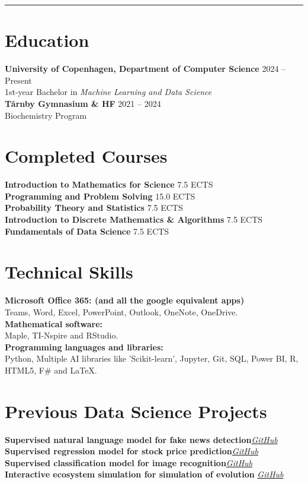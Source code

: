 \documentclass[a4paper,11.5pt]{article}
\begin{document}
\noindent\rule{\textwidth}{0.6pt}

\section*{Education}
\textbf{University of Copenhagen, Department of Computer Science} \hfill 2024 -- Present \\
1st-year Bachelor in \textit{Machine Learning and Data Science}\\
\textbf{T\aa rnby Gymnasium \& HF} \hfill 2021 -- 2024\\ 
Biochemistry Program

\section*{Completed Courses}
\textbf{Introduction to Mathematics for Science} \hfill 7.5 ECTS\\
\textbf{Programming and Problem Solving} \hfill 15.0 ECTS\\
\textbf{Probability Theory and Statistics} \hfill 7.5 ECTS\\
\textbf{Introduction to Discrete Mathematics \& Algorithms} \hfill 7.5 ECTS\\ 
\textbf{Fundamentals of Data Science} \hfill 7.5 ECTS

\section*{Technical Skills}
\textbf{Microsoft Office 365: (and all the google equivalent apps)}\\
Teams, Word, Excel, PowerPoint, Outlook, OneNote, OneDrive. \\
\textbf{Mathematical software:}\\
Maple, TI-Nspire and RStudio. \\
\textbf{Programming languages and libraries:}\\
Python, Multiple AI libraries like 'Scikit-learn', Jupyter, Git, SQL, Power BI, R, HTML5, F\# and \LaTeX.

\section*{Previous Data Science Projects}
\textbf{Supervised natural language model for fake news detection}\hfill \href{https://github.com/P1N60/fake_news_detection_model}{\textit{GitHub}} \\
\textbf{Supervised regression model for stock price prediction}\hfill \href{https://github.com/P1N60/stock_predictor}{\textit{GitHub}} \\
\textbf{Supervised classification model for image recognition}\hfill \href{https://github.com/P1N60/image_classifier}{\textit{GitHub}}\\
\textbf{Interactive ecosystem simulation for simulation of evolution }\hfill \href{https://github.com/P1N60/ecosystem_simulation}{\textit{GitHub}}
\end{document}

